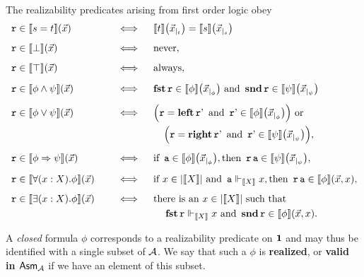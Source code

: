 \begin{proposition}\label{realizability-logic}
  The realizability predicates arising from first order logic obey
  \begin{alignat*}{2}
    &\pca{r} \in \sem{s = t}(\vec x)
    &&\quad\iff\quad \sem{t}\pa*{\vec x_{|_t}} = \sem{s}\pa*{\vec x_{|_s}} \\[5pt]
    &\pca{r} \in \sem{\bot}(\vec x)
    &&\quad\iff\quad \text{never}, \\[5pt]
    &\pca{r} \in \sem{\top}(\vec x)
    &&\quad\iff\quad \text{always}, \\[5pt]
    &\pca{r} \in \sem{\phi \land \psi}(\vec x)
    &&\quad\iff\quad \pcafst\pca{r}\in\sem{\phi}\pa[\big]{\vec x_{|_\phi}} \text{ and }
       \pcasnd\pca{r}\in\sem{\psi}\pa[\big]{\vec x_{|_\psi}} \\[5pt]
    &\pca{r} \in \sem{\phi \lor \psi}(\vec x)
    &&\quad\iff\quad
       \pa[\Big]{\pca{r} = \pcaleft\pca{r'}
       \text{ and } \pca{r'}\in \sem{\phi}\pa[\big]{\vec x_{|_\phi}}}
       \text{ or } \\%
    & &&\hspace{60pt} \pa[\Big]{\pca{r} = \pcaright\pca{r'}
         \text{ and } \pca{r'}\in \sem{\psi}\pa[\big]{\vec x_{|_\psi}}}, \\[5pt]
    &\pca{r} \in \sem{\phi \Rightarrow \psi}(\vec x)
    &&\quad\iff\quad \text{if } \pca{a} \in \sem{\phi}\pa[\big]{\vec x_{|_\phi}}, \text{then }
       \pca{r}\pca{a} \in \sem{\psi}\pa[\big]{\vec x_{|_\psi}}, \\[5pt]
    &\pca{r} \in \sem{\forall(x : X).\phi}(\vec x)
    &&\quad\iff\quad \text{if } x \in \carrier{\sem{X}}
       \text{ and } \pca{a} \realizes_{\sem{X}} x, \text{then }
       \pca{r}\pca{a} \in \sem{\phi}(\vec x,x), \\[5pt]
    &\pca{r} \in \sem{\exists(x : X).\phi}(\vec x)
    &&\quad\iff\quad \text{there is an } x \in \carrier{\sem{X}}
       \text{ such that} \\%
    & &&\phantom{\hspace{60pt}} \pcafst\pca{r} \realizes_{\sem{X}} x \text{ and }
         \pcasnd\pca{r} \in \sem{\phi}(\vec x,x).
  \end{alignat*}
\end{proposition}

A \emph{closed} formula \(\phi\) corresponds to a realizability predicate on
\(\One\) and may thus be identified with a single subset of \(\AA\).
%
We say that such a \(\phi\) is \textbf{realized}, or \textbf{valid in
  \(\Asm{\AA}\)} if we have an element of this subset.

